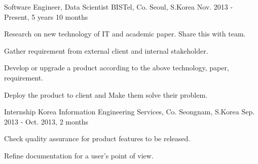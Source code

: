 

\begin{cventries}

  \cventry
    {Software Engineer, Data Scientist} %
    {BISTel, Co.} %
    {Seoul, S.Korea} %
    {Nov. 2013 - Present, 5 years 10 months} %
    {
      \begin{cvitems} %
        \item {Research on new technology of IT and academic paper. Share this with team.}
        \item {Gather requirement from external client and internal stakeholder.}
        \item {Develop or upgrade a product according to the above technology, paper, requirement.}
        \item {Deploy the product to client and Make them solve their problem.}
      \end{cvitems}
    }

  \cventry
    {Internship} %
    {Korea Information Engineering Services, Co.} %
    {Seongnam, S.Korea} %
    {Sep. 2013 - Oct. 2013, 2 months} %
    {
      \begin{cvitems} %
        \item {Check quality assurance for product features to be released.}
        \item {Refine documentation for a user's point of view.}
      \end{cvitems}
    }

\end{cventries}
